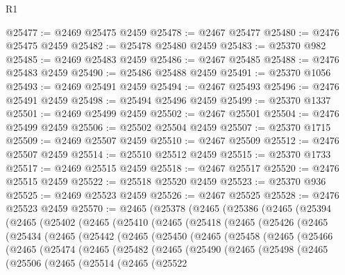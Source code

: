 \begin{lexlean}{R1}
\begin{coremodule}
@25477 := @2469 @25475 @2459
@25478 := @2467 @25477
@25480 := @2476 @25475 @2459
@25482 := @25478 @25480 @2459
@25483 := @25370 @982
@25485 := @2469 @25483 @2459
@25486 := @2467 @25485
@25488 := @2476 @25483 @2459
@25490 := @25486 @25488 @2459
@25491 := @25370 @1056
@25493 := @2469 @25491 @2459
@25494 := @2467 @25493
@25496 := @2476 @25491 @2459
@25498 := @25494 @25496 @2459
@25499 := @25370 @1337
@25501 := @2469 @25499 @2459
@25502 := @2467 @25501
@25504 := @2476 @25499 @2459
@25506 := @25502 @25504 @2459
@25507 := @25370 @1715
@25509 := @2469 @25507 @2459
@25510 := @2467 @25509
@25512 := @2476 @25507 @2459
@25514 := @25510 @25512 @2459
@25515 := @25370 @1733
@25517 := @2469 @25515 @2459
@25518 := @2467 @25517
@25520 := @2476 @25515 @2459
@25522 := @25518 @25520 @2459
@25523 := @25370 @936
@25525 := @2469 @25523 @2459
@25526 := @2467 @25525
@25528 := @2476 @25523 @2459
@25570 := @2465
    (@25378
      (@2465
        (@25386
          (@2465
            (@25394
              (@2465
                (@25402
                  (@2465
                    (@25410
                      (@2465
                        (@25418
                          (@2465
                            (@25426
                              (@2465
                                (@25434
                                  (@2465
                                    (@25442
                                      (@2465
                                        (@25450
                                          (@2465
                                            (@25458
                                              (@2465
                                                (@25466
                                                  (@2465
                                                    (@25474
                                                      (@2465
                                                        (@25482
                                                          (@2465
                                                            (@25490
                                                              (@2465
                                                                (@25498
                                                                  (@2465
                                                                    (@25506
                                                                      (@2465
                                                                        (@25514
                                                                          (@2465
                                                                            (@25522

\end{coremodule}
\end{lexlean}
